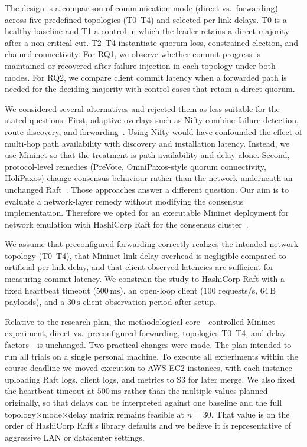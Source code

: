 \documentclass[11pt,a4paper]{article}
\begin{document}
The design is a comparison of communication mode (\(\mathrm{direct}\) vs.\ \(\mathrm{forwarding}\)) across five predefined topologies (T0--T4) and selected per-link delays.
T0 is a healthy baseline and T1 a control in which the leader retains a direct majority after a non-critical cut. T2--T4 instantiate quorum-loss, constrained election, and chained connectivity.
For RQ1, we observe whether commit progress is maintained or recovered after failure injection in each topology under both modes.
For RQ2, we compare client commit latency when a forwarded path is needed for the deciding majority with control cases that retain a direct quorum.

We considered several alternatives and rejected them as less suitable for the stated questions.
First, adaptive overlays such as Nifty combine failure detection, route discovery, and forwarding~\cite{alfatafta2020nifty}.
Using Nifty would have confounded the effect of multi-hop path availability with discovery and installation latency. Instead, we use Mininet so that the treatment is path availability and delay alone.
Second, protocol-level remedies (PreVote, OmniPaxos-style quorum connectivity, HoliPaxos) change consensus behaviour rather than the network underneath an unchanged Raft~\cite{jensen2021raft,ng2023omnipaxos,liang2025holipaxos}.
Those approaches answer a different question. Our aim is to evaluate a network-layer remedy without modifying the consensus implementation.
Therefore we opted for an executable Mininet deployment for network emulation with HashiCorp Raft for the consensus cluster~\cite{hashicorp_raft,lantz2010mininet}.

We assume that preconfigured forwarding correctly realizes the intended network topology (T0--T4), that Mininet link delay overhead is negligible compared to artificial per-link delay, and that client observed latencies are sufficient for measuring commit latency.
We constrain the study to HashiCorp Raft with a fixed heartbeat timeout (\(500\,\mathrm{ms}\)), an open-loop client (\(100\) requests/s, \(64\,\mathrm{B}\) payloads), and a \(30\,\mathrm{s}\) client observation period after setup.

Relative to the research plan, the methodological core---controlled Mininet experiment, direct vs.\ preconfigured forwarding, topologies T0--T4, and delay factors---is unchanged.
Two practical changes were made.
The plan intended to run all trials on a single personal machine. To execute all experiments within the course deadline we moved execution to AWS EC2 instances, with each instance uploading Raft logs, client logs, and metrics to S3 for later merge.
We also fixed the heartbeat timeout at \(500\,\mathrm{ms}\) rather than the multiple values planned originally, so that delays can be interpreted against one baseline and the full topology\(\times\)mode\(\times\)delay matrix remains feasible at \(n=30\).
That value is on the order of HashiCorp Raft's library defaults \cite{hashicorp_raft} and we believe it is representative of aggressive LAN or datacenter settings.
\end{document}
